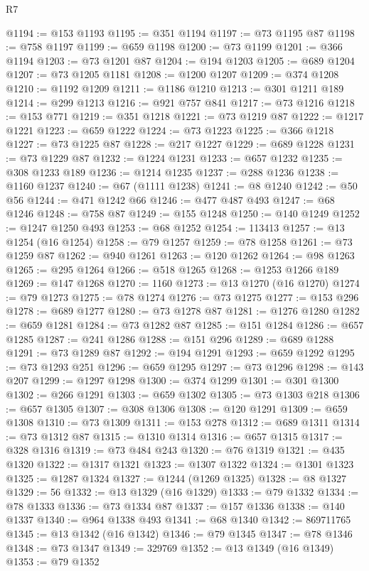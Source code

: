 \begin{lexlean}{R7}
\begin{coremodule}
@1194 := @153 @1193
@1195 := @351 @1194
@1197 := @73 @1195 @87
@1198 := @758 @1197
@1199 := @659 @1198
@1200 := @73 @1199
@1201 := @366 @1194
@1203 := @73 @1201 @87
@1204 := @194 @1203
@1205 := @689 @1204
@1207 := @73 @1205 @1181
@1208 := @1200 @1207
@1209 := @374 @1208
@1210 := @1192 @1209
@1211 := @1186 @1210
@1213 := @301 @1211 @189
@1214 := @299 @1213
@1216 := @921 @757 @841
@1217 := @73 @1216
@1218 := @153 @771
@1219 := @351 @1218
@1221 := @73 @1219 @87
@1222 := @1217 @1221
@1223 := @659 @1222
@1224 := @73 @1223
@1225 := @366 @1218
@1227 := @73 @1225 @87
@1228 := @217 @1227
@1229 := @689 @1228
@1231 := @73 @1229 @87
@1232 := @1224 @1231
@1233 := @657 @1232
@1235 := @308 @1233 @189
@1236 := @1214 @1235
@1237 := @288 @1236
@1238 := @1160 @1237
@1240 := @67 (@1111 @1238)
@1241 := @8 @1240
@1242 := @50 @56
@1244 := @471 @1242 @66
@1246 := @477 @487 @493
@1247 := @68 @1246
@1248 := @758 @87
@1249 := @155 @1248
@1250 := @140 @1249
@1252 := @1247 @1250 @493
@1253 := @68 @1252
@1254 := 113413
@1257 := @13 @1254 (@16 @1254)
@1258 := @79 @1257
@1259 := @78 @1258
@1261 := @73 @1259 @87
@1262 := @940 @1261
@1263 := @120 @1262
@1264 := @98 @1263
@1265 := @295 @1264
@1266 := @518 @1265
@1268 := @1253 @1266 @189
@1269 := @147 @1268
@1270 := 1160
@1273 := @13 @1270 (@16 @1270)
@1274 := @79 @1273
@1275 := @78 @1274
@1276 := @73 @1275
@1277 := @153 @296
@1278 := @689 @1277
@1280 := @73 @1278 @87
@1281 := @1276 @1280
@1282 := @659 @1281
@1284 := @73 @1282 @87
@1285 := @151 @1284
@1286 := @657 @1285
@1287 := @241 @1286
@1288 := @151 @296
@1289 := @689 @1288
@1291 := @73 @1289 @87
@1292 := @194 @1291
@1293 := @659 @1292
@1295 := @73 @1293 @251
@1296 := @659 @1295
@1297 := @73 @1296
@1298 := @143 @207
@1299 := @1297 @1298
@1300 := @374 @1299
@1301 := @301 @1300
@1302 := @266 @1291
@1303 := @659 @1302
@1305 := @73 @1303 @218
@1306 := @657 @1305
@1307 := @308 @1306
@1308 := @120 @1291
@1309 := @659 @1308
@1310 := @73 @1309
@1311 := @153 @278
@1312 := @689 @1311
@1314 := @73 @1312 @87
@1315 := @1310 @1314
@1316 := @657 @1315
@1317 := @328 @1316
@1319 := @73 @484 @243
@1320 := @76 @1319
@1321 := @435 @1320
@1322 := @1317 @1321
@1323 := @1307 @1322
@1324 := @1301 @1323
@1325 := @1287 @1324
@1327 := @1244 (@1269 @1325)
@1328 := @8 @1327
@1329 := 56
@1332 := @13 @1329 (@16 @1329)
@1333 := @79 @1332
@1334 := @78 @1333
@1336 := @73 @1334 @87
@1337 := @157 @1336
@1338 := @140 @1337
@1340 := @964 @1338 @493
@1341 := @68 @1340
@1342 := 869711765
@1345 := @13 @1342 (@16 @1342)
@1346 := @79 @1345
@1347 := @78 @1346
@1348 := @73 @1347
@1349 := 329769
@1352 := @13 @1349 (@16 @1349)
@1353 := @79 @1352

\end{coremodule}
\end{lexlean}
